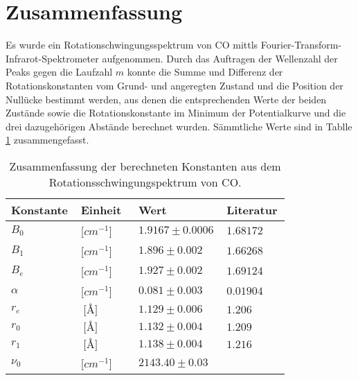 % 
%
\section{Zusammenfassung}
Es wurde ein Rotationschwingungsspektrum von CO mittls Fourier-Transform-Infrarot-Spektrometer aufgenommen. Durch das Auftragen der Wellenzahl der Peaks gegen die Laufzahl $m$ konnte die Summe und Differenz der Rotationskonstanten vom Grund- und angeregten Zustand und die Position der Nullücke bestimmt werden, aus denen die entsprechenden Werte der beiden Zustände sowie die Rotationskonstante im Minimum der Potentialkurve und die drei dazugehörigen Abstände berechnet wurden. Sämmtliche Werte sind in Tablle \ref{Zusammenfassung} zusammengefasst.

\begin{table}
\label{Zusammenfassung}
	\caption{Zusammenfassung der berechneten Konstanten aus dem Rotationsschwingungspektrum von CO.}
\begin{tabular}{C{0.2\linewidth}|C{0.2\linewidth}|C{0.2\linewidth}|C{0.2\linewidth}}
Konstante             & Einheit                  & Wert                           & Literatur \\ \hline
$B_0$                  & [$cm^{-1}$]          & $1.9167 \pm 0.0006$	& $1.68172$   \\
$B_1$                  & [$cm^{-1}$]          & $1.896 \pm 0.002$   	& $1.66268$   \\
$B_e $                 & [$cm^{-1}$]          & $1.927 \pm 0.002$   	& $1.69124$   \\
$\alpha$		& [$cm^{-1}$]       & $0.081 \pm 0.003$   	& $0.01904$   \\
$r_e$                  & $\SI{}{[\angstrom]}$		& $1.129 \pm 0.006 $  	& $1.206$     \\
$r_0$                  & $\SI{}{[\angstrom]} $		& $1.132 \pm 0.004$  	 & $1.209$     \\
$r_1$                  & $\SI{}{[\angstrom]}$ 		& $1.138 \pm 0.004$  	 & $1.216$    \\
$\nu_0$	&[$cm^{-1}$]          & $2143.40 \pm 0.03$&
\end{tabular}
\end{table}


%


